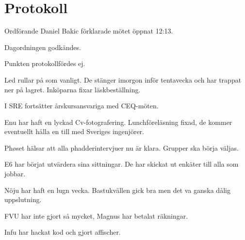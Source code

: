 \documentclass[10pt]{article}
\def\mo{Daniel Bakic}
\begin{document}
\section*{Protokoll}
\begin{paragrafer}
Ordförande {\mo} förklarade mötet öppnat 12:13.

{\valavmo}

{\valavms}

{\valavj}

{\tosg}



Dagordningen godkändes.



\ingaprot

\begin{fyllnadsval} %
\end{fyllnadsval}

\begin{paragrafer}
Punkten protokollfördes ej.

Led rullar på som vanligt. De stänger imorgon inför tentavecka och har trappat ner på lagret. Inköparna fixar läskbeställning.

I SRE fortsätter årskursansvariga med CEQ-möten.

Enu har haft en lyckad Cv-fotografering. Lunchföreläsning fixad, de kommer eventuellt hålla en till med Sveriges ingenjörer.

Phøset hälsar att alla phadderintervjuer nu är klara. Grupper ska börja väljas.

E6 har börjat utvärdera sina sittningar. De har skickat ut enkäter till alla som jobbar.

Nöju har haft en lugn vecka. Bastukvällen gick bra men det va ganska dålig uppslutning.

FVU har inte gjort så mycket, Magnus har betalat räkningar.

Infu har hackat kod och gjort affischer.


\end{paragrafer}
\end{paragrafer}
\end{document}
